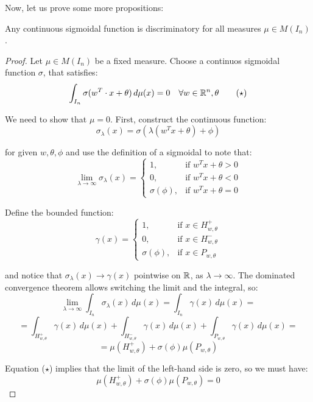 Now, let us prove some more propositions:

\begin{proposition}
    Any continuous sigmoidal function is discriminatory for all measures $\mu \in M(I_n)$.
\end{proposition}

\begin{proof}
    Let $\mu \in M(I_n)$ be a fixed measure. Choose a continuos sigmoidal function $\sigma$,
    that satisfies:
    \begin{equation}
        \int_{I_n} \sigma(w^T \cdot x + \theta) \, d\mu(x) = 0 \quad \forall w \in \mathbb{R}^n, \theta
        \tag{$\star$}
    \end{equation}
    

    We need to show that $\mu = 0$. First, construct the continuous function:
    $$\sigma_{\lambda}(x) = \sigma(\lambda (w^T x + \theta) + \phi)$$

    for given $w, \theta, \phi$ and use the definition of a sigmoidal to note that:
    $$\lim_{\lambda \to \infty} \sigma_{\lambda}(x) = \begin{cases}
        1, & \text{if } w^T x + \theta > 0 \\
        0, & \text{if } w^T x + \theta < 0\\
        \sigma(\phi), & \text{if } w^T x + \theta = 0
    \end{cases}$$

    Define the bounded function:
    $$\gamma(x) = \begin{cases}
        1, & \text{if } x \in H_{w, \theta}^+ \\
        0, & \text{if } x \in H_{w, \theta}^- \\
        \sigma(\phi), & \text{if } x \in P_{w, \theta}
    \end{cases}$$

    and notice that $\sigma_{\lambda}(x) \to \gamma(x)$ pointwise on $\mathbb{R}$, as $\lambda \to \infty$.
    The dominated convergence theorem allows switching the limit and the integral, so:
    $$\lim_{\lambda \to \infty} \int_{I_n} \sigma_{\lambda}(x) \, d\mu(x) = \int_{I_n} \gamma(x) \, d\mu(x)=$$
    $$= \int_{H_{w, \theta}^+} \gamma(x) \, d\mu(x) + \int_{H_{w, \theta}^-} \gamma(x) \, d\mu(x) + \int_{P_{w, \theta}} \gamma(x) \, d\mu(x) =$$
    $$= \mu(H_{w, \theta}^+) + \sigma(\phi) \mu(P_{w, \theta})$$

    Equation ($\star$) implies that the limit of the left-hand side is zero, so we must have:
    $$\mu(H_{w, \theta}^+) + \sigma(\phi) \mu(P_{w, \theta}) = 0$$


\end{proof}
